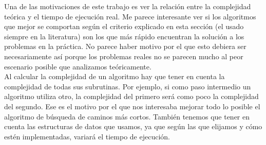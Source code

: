 Una de las motivaciones de este trabajo es ver la relación entre la complejidad teórica y el tiempo de ejecución real.
Me parece interesante ver si los algoritmos que mejor se comportan según el criterio explicado en esta sección (el usado siempre en la literatura) son los que más rápido encuentran la solución a los problemas en la práctica.
No parece haber motivo por el que esto debiera ser necesariamente así porque los problemas reales no se parecen mucho al peor escenario posible que analizamos teóricamente.\\

Al calcular la complejidad de un algoritmo hay que tener en cuenta la complejidad de todas sus subrutinas.
Por ejemplo, si como paso intermedio un algoritmo utiliza otro, la complejidad del primero será como poco la complejidad del segundo.
Ese es el motivo por el que nos interesaba mejorar todo lo posible el algoritmo de búsqueda de caminos más cortos.
También tenemos que tener en cuenta las estructuras de datos que usamos, ya que según las que elijamos y cómo estén implementadas, variará el tiempo de ejecución.\\

